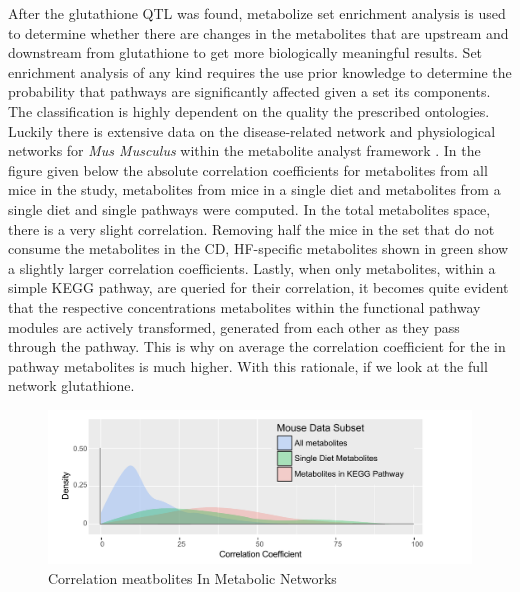 \documentclass[a4paper,11pt,twoside]{book}
\begin{document}
    After the glutathione QTL was found, metabolize set enrichment analysis is used to determine whether there are changes in the metabolites that are upstream and downstream from glutathione to get more biologically meaningful results. Set enrichment analysis of any kind requires the use prior knowledge to determine the probability that pathways are significantly affected given a set its components. The classification is highly dependent on the quality the prescribed ontologies. Luckily there is extensive data on the disease-related network and physiological networks for \textit{Mus Musculus} within the metabolite analyst framework \citep{Xia2016UsingAnalysis}. In the figure given below the absolute correlation coefficients for metabolites from all mice in the study, metabolites from mice in a single diet and metabolites from a single diet and single pathways were computed. In the total metabolites space, there is a very slight correlation. Removing half the mice in the set that do not consume the metabolites in the CD, HF-specific metabolites shown in green show a slightly larger correlation coefficients. Lastly, when only metabolites, within a simple KEGG pathway, are queried for their correlation, it becomes quite evident that the respective concentrations metabolites within the functional pathway modules are actively transformed, generated from each other as they pass through the pathway. This is why on average the correlation coefficient for the in pathway metabolites is much higher. With this rationale, if we look at the full network glutathione.
	
	\begin{figure}[htb!]
		\centering
		\includegraphics[width=\linewidth]{3.Metabolomics/KEGG_Path_Correlations}
		\caption{Correlation meatbolites In Metabolic Networks}
		\label{fig:keggpathcorrelations}
	\end{figure}
	
\end{document}
